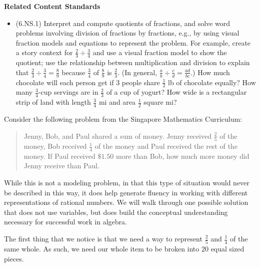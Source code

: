 \documentclass[
]{book}
\providecommand{\tightlist}{%
  \setlength{\itemsep}{0pt}\setlength{\parskip}{0pt}}
\newenvironment{standards}{}{}
\theoremstyle{definition}
\theoremstyle{definition}
\theoremstyle{definition}
\theoremstyle{definition}
\theoremstyle{remark}
\begin{document}
\begin{standards}

\begin{center}
\textbf{Related Content Standards}

\end{center}

\begin{itemize}
\tightlist
\item
  (6.NS.1) Interpret and compute quotients of fractions, and solve word problems involving division of fractions by fractions, e.g., by using visual fraction models and equations to represent the problem. For example, create a story context for \(\frac{2}{3} \div \frac{3}{4}\) and use a visual fraction model to show the quotient; use the relationship between multiplication and division to explain that \(\frac{2}{3} \div \frac{3}{4} = \frac{8}{9}\) because \(\frac{3}{4}\) of \(\frac{8}{9}\) is \(\frac{2}{3}\). (In general, \(\frac{a}{b} \div \frac{c}{d} = \frac{ad}{bc}\).) How much chocolate will each person get if 3 people share \(\frac{1}{2}\) lb of chocolate equally? How many \(\frac{3}{4}\)-cup servings are in \(\frac{2}{3}\) of a cup of yogurt? How wide is a rectangular strip of land with length \(\frac{3}{4}\) mi and area \(\frac{1}{2}\) square mi?\\
\end{itemize}

\end{standards}

Consider the following problem from the Singapore Mathematics Curriculum:

\begin{quote}
Jenny, Bob, and Paul shared a sum of money. Jenny received \(\frac{2}{5}\) of the money, Bob received \(\frac{1}{4}\) of the money and Paul received the rest of the money. If Paul received \(\$1.50\) more than Bob, how much more money did Jenny receive than Paul.
\end{quote}

While this is not a modeling problem, in that this type of situation would never be described in this way, it does help generate fluency in working with different representations of rational numbers. We will walk through one possible solution that does not use variables, but does build the conceptual understanding necessary for successful work in algebra.

The first thing that we notice is that we need a way to represent \(\frac{2}{5}\) and \(\frac{1}{4}\) of the same whole. As such, we need our whole item to be broken into \(20\) equal sized pieces.
\end{document}
